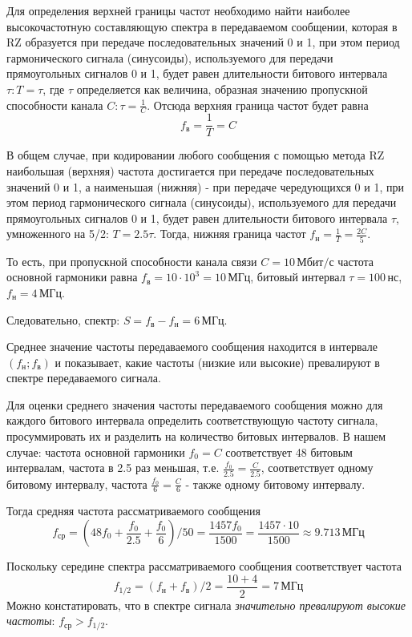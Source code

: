 Для определения верхней границы частот необходимо найти наиболее высокочастотную составляющую спектра в передаваемом сообщении, которая в RZ образуется при передаче последовательных значений 0 и 1, при этом период гармонического сигнала (синусоиды), используемого для передачи прямоугольных сигналов 0 и 1, будет равен длительности битового интервала $\tau: T = \tau$, где $\tau$ определяется как величина, образная значению пропускной способности канала $C: \tau = \frac{1}{C}$. Отсюда верхняя граница частот будет равна \[f_{\text{в}} = \frac{1}{T} = C\]

В общем случае, при кодировании любого сообщения с помощью метода RZ наибольшая (верхняя) частота достигается при передаче последовательных значений 0 и 1, а наименьшая (нижняя) - при передаче чередующихся 0 и 1, при этом период гармонического сигнала (синусоиды), используемого для передачи прямоугольных сигналов 0 и 1, будет равен длительности битового интервала $\tau$, умноженного на 5/2: $T = 2.5 \tau$. Тогда, нижняя граница частот $f_{\text{н}} = \frac{1}{T} = \frac{2C}{5}$.

То есть, при пропускной способности канала связи $C = 10 \, \text{Мбит/с}$ частота основной гармоники равна $f_{\text{в}} = 10 \cdot 10^3 = 10 \, \text{МГц}$, битовый интервал $\tau = 100 \, \text{нс}$, $f_{\text{н}} = 4 \, \text{МГц}$.

Следовательно, спектр: $S = f_{\text{в}} - f_{\text{н}} = 6 \, \text{МГц}$.

Среднее значение частоты передаваемого сообщения находится в интервале $(f_{\text{н}};f_{\text{в}})$ и показывает, какие частоты (низкие или высокие) превалируют в спектре передаваемого сигнала.

Для оценки среднего значения частоты передаваемого сообщения можно для каждого битового интервала определить соответствующую частоту сигнала, просуммировать их и разделить на количество битовых интервалов. В нашем случае: частота основной гармоники $f_0 = C$ соответствует 48 битовым интервалам, частота в 2.5 раз меньшая, т.е. $\frac{f_0}{2.5} = \frac{C}{2.5}$, соответствует одному битовому интервалу, частота $\frac{f_0}{6} = \frac{C}{6}$ - также одному битовому интервалу.

Тогда средняя частота рассматриваемого сообщения
\[
	f_{\text{ср}} = \left(48f_0+\frac{f_0}{2.5}+\frac{f_0}{6}\right)/ 50 = \frac{1457f_0}{1500} = \frac{1457 \cdot 10}{1500} \approx 9.713 \, \text{МГц}
\]

Поскольку середине спектра рассматриваемого сообщения соответствует частота
\[
	f_{1/2} = (f_{\text{н}} + f_{\text{в}}) /2 = \frac{10 + 4}{2} = 7 \, \text{МГц}
\]
Можно констатировать, что в спектре сигнала \textit{значительно превалируют высокие частоты}: $f_{\text{ср}} > f_{1/2}$.

